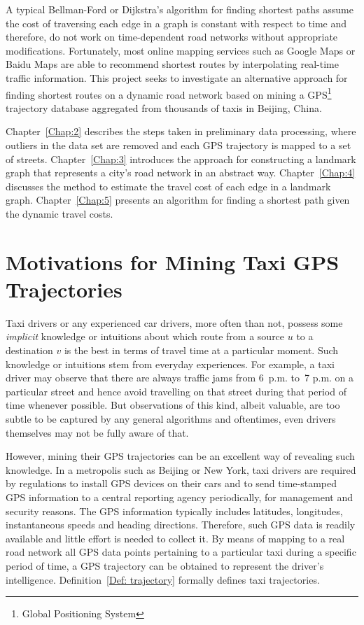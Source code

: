 A typical Bellman-Ford \cite{CLRS09} or Dijkstra's algorithm \cite{Dij59} for finding shortest paths assume the cost of traversing each edge in a graph is constant with respect to time and therefore, do not work on time-de\-pendent road networks without appropriate modifications. Fortunately, most online mapping services such as Google Maps or Baidu Maps are able to recommend shortest routes by interpolating real-time traffic information. This project seeks to investigate an alternative approach for finding shortest routes on a dynamic road network based on mining a GPS\footnote{Global Positioning System} trajectory database aggregated from thousands of taxis in Beijing, China.

Chapter~\ref{Chap:2} describes the steps taken in preliminary data processing, where outliers in the data set are removed and each GPS trajectory is mapped to a set of streets. Chapter~\ref{Chap:3} introduces the approach for constructing a landmark graph that represents a city's road network in an abstract way. Chapter~\ref{Chap:4} discusses the method to estimate the travel cost of each edge in a landmark graph. Chapter~\ref{Chap:5} presents an algorithm for finding a shortest path given the dynamic travel costs. 

\section{Motivations for Mining Taxi GPS Trajectories}
Taxi drivers or any experienced car drivers, more often than not, possess some \emph{implicit} knowledge or intuitions about which route from a source $u$ to a destination $v$ is the best in terms of travel time at a particular moment. Such knowledge or intuitions stem from everyday experiences. For example, a taxi driver may observe that there are always traffic jams from 6~p.m. to~7 p.m. on a particular street and hence avoid travelling on that street during that period of time whenever possible. But observations of this kind, albeit valuable, are too subtle to be captured by any general algorithms and oftentimes, even drivers themselves may not be fully aware of that.

However, mining their GPS trajectories can be an excellent way of revealing such knowledge. In a metropolis such as Beijing or New York, taxi drivers are required by regulations to install GPS devices on their cars and to send time-stamped GPS information to a central reporting agency periodically, for management and security reasons. The GPS information typically includes latitudes, longitudes, instantaneous speeds and heading directions. Therefore, such GPS data is readily available and little effort is needed to collect it. By means of mapping to a real road network all GPS data points pertaining to a particular taxi during a specific period of time, a GPS trajectory can be obtained to represent the driver's intelligence. Definition~\ref{Def: trajectory} formally defines taxi trajectories. 

